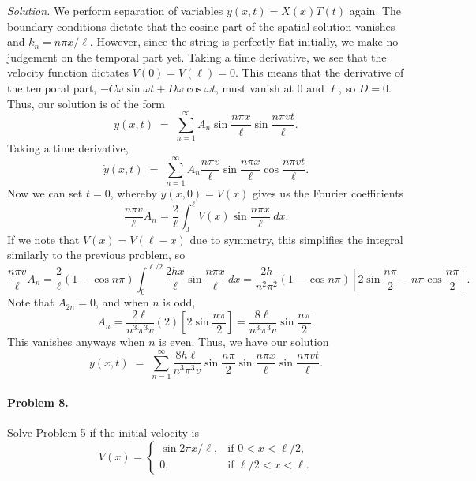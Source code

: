 \documentclass[10pt]{article}
\begin{document}
        \textit{Solution.} We perform separation of variables $y(x, t) = X(x)T(t)$ again. The boundary conditions dictate that the cosine part
        of the spatial solution vanishes and $k_n = n\pi x/\ell$. However, since the string is perfectly flat initially,
        we make no judgement on the temporal part yet. Taking a time derivative, we see that the velocity function dictates $V(0) = V(\ell) = 0$.
        This means that the derivative of the temporal part, $-C\omega\sin{\omega t} + D\omega\cos{\omega t}$, must vanish at $0$ and $\ell$,
        so $D = 0$. Thus, our solution is of the form
        \[
                y(x, t) \;=\; \sum_{n = 1}^\infty A_n\sin\frac{n\pi x}{\ell} \sin\frac{n\pi vt}{\ell}.
        \]
        Taking a time derivative,
        \[
                \dot{y}(x, t) \;=\; \sum_{n = 1}^\infty A_n\frac{n\pi v}{\ell}\sin\frac{n\pi x}{\ell} \cos\frac{n\pi vt}{\ell}.
        \]
        Now we can set $t = 0$, whereby $\dot{y}(x, 0) = V(x)$ gives us the Fourier coefficients
        \[
                \frac{n\pi v}{\ell}A_n = \frac{2}{\ell}\int_0^\ell V(x) \sin\frac{n\pi x}{\ell}\: dx.
        \]
        If we note that $V(x) = V(\ell - x)$ due to symmetry, this simplifies the integral similarly to the previous problem, so
        \[
                \frac{n\pi v}{\ell}A_n = \frac{2}{\ell}(1 - \cos{n\pi})\int_0^{\ell/2} \frac{2hx}{\ell}\sin\frac{n\pi x}{\ell}\: dx = 
                        \frac{2h}{n^2\pi^2}(1 - \cos{n\pi})\left[2\sin\frac{n\pi}{2} - n\pi\cos\frac{n\pi}{2}\right].
        \]
        Note that $A_{2n} = 0$, and when $n$ is odd,
        \[
                A_n = \frac{2\ell}{n^3\pi^3v} (2)\left[2\sin\frac{n\pi}{2}\right] = \frac{8\ell}{n^3\pi^3 v}\sin\frac{n\pi}{2}.
        \]
        This vanishes anyways when $n$ is even. Thus, we have our solution
        \[
                y(x, t) \;=\; \sum_{n = 1}^\infty \frac{8h\ell}{n^3\pi^3v}\sin\frac{n\pi}{2}\sin\frac{n\pi x}{\ell} \sin\frac{n\pi vt}{\ell}.
        \]

        \paragraph{Problem 8.} Solve Problem 5 if the initial velocity is 
        \[
                V(x) = \begin{cases}
                        \sin{2\pi x/\ell}, &\text{if } 0 < x < \ell/2, \\
                        0, &\text{if } \ell/2 < x < \ell.
                \end{cases}
        \]\\
\end{document}
